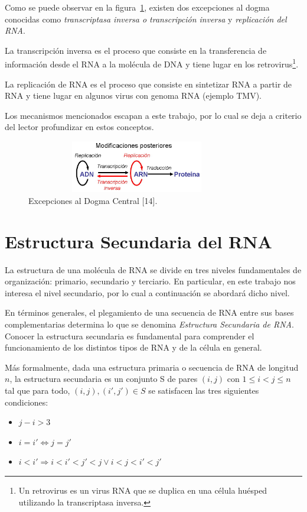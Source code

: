 \par Como se puede observar en la figura~\ref{excepcionesDogma}, existen dos excepciones al dogma conocidas como \textit{transcriptasa inversa o transcripción inversa} y \textit{replicación del RNA}.
\par La transcripción inversa\cite{curtis} es el proceso que consiste en la transferencia de información desde el RNA a la molécula de DNA y tiene lugar en los retrovirus\footnote{Un retrovirus es un virus RNA que se duplica en una célula huésped utilizando la transcriptasa inversa.}.
\par La replicación de RNA\cite{curtis} es el proceso que consiste en sintetizar RNA a partir de RNA y tiene lugar en algunos virus con genoma RNA (ejemplo TMV).
\par Los mecanismos mencionados escapan a este trabajo, por lo cual se deja a criterio del lector profundizar en estos conceptos.
\begin{figure} [h]
	\hspace*{2cm}\includegraphics[width=3.8209in,height=0.9000in]{image/excepcionesDogma.jpg}
	\caption{Excepciones al Dogma Central [14].}
	\label{excepcionesDogma}
\end{figure}	

\vskip 1cm
\section{Estructura Secundaria del RNA} 
La estructura de una molécula de RNA se divide en tres niveles fundamentales de organización: primario, secundario y terciario. En particular, en este trabajo nos interesa el nivel secundario, por lo cual a continuación se abordará dicho nivel.

\par En términos generales, el plegamiento de una secuencia de RNA entre sus bases complementarias determina lo que se denomina \emph{Estructura Secundaria de RNA}. Conocer la estructura secundaria es fundamental para comprender el funcionamiento de los distintos tipos de RNA y de la célula en general. 

\par Más formalmente, dada una estructura primaria o secuencia de RNA de longitud $n$, la estructura secundaria es un conjunto S de pares $(i,j)$ con $1\leq i < j \leq n$ tal que para todo, $(i,j), (i',j') \in S$ se satisfacen las tres siguientes     condiciones:
\begin{itemize}
	\item $j-i > 3$
    \item $i=i' \Leftrightarrow j=j'$
    \item $i< i'\Rightarrow i < i' < j' < j \lor i < j < i' < j'$ 
\end{itemize}

